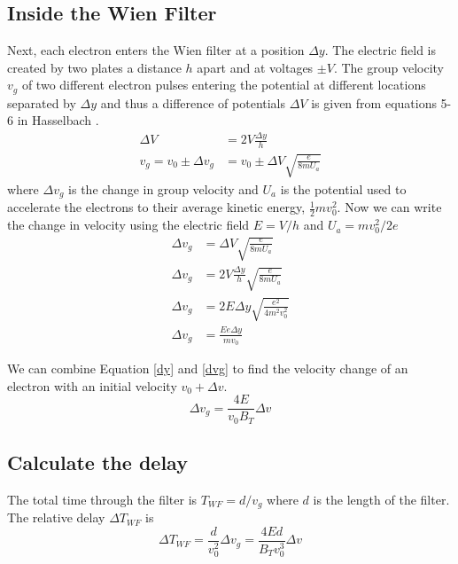 \documentclass[12pt,letterpaper]{article}
\newcommand{\eqqref}[1]{Equation \ref{#1}}
\newcommand{\dv}{\Delta v}
\newcommand{\dy}{\Delta y}
\newcommand{\dd}{\Delta }
\begin{document}
\subsection{Inside the Wien Filter}
Next, each electron enters the Wien filter at a position $\dy$. 
The electric field is created by two plates a distance $h$ apart and at voltages $\pm V$.
The group velocity $v_g$ of two different electron pulses entering the potential at different locations separated by $\dy$ and thus a difference of potentials $\dd V$ is given from equations 5-6 in Hasselbach \cite{hasselbach}.
\begin{align*}
   \dd V &= 2V \frac{\dy}{h} \\
   v_g = v_0 \pm \dv_g &= v_0 \pm \dd V \sqrt{\frac{e}{8 m U_a}}
\end{align*}
where $\dv_g$ is the change in group velocity and $U_a$ is the potential used to accelerate the electrons to their average kinetic energy, $\frac{1}{2}mv_0^2$.
Now we can write the change in velocity using the electric field $E=V/h$ and $U_a=mv_0^2/2e$
\begin{align}
   \dv_g&=\dd V \sqrt{\frac{e}{8 m U_a}} \nonumber \\
   \dv_g&= 2V \frac{\dy}{h} \sqrt{\frac{e}{8 m U_a}} \nonumber \\
   \dv_g&= 2 E \dy \sqrt{\frac{e^2}{4 m^2 v_0^2 }} \nonumber \\
   \dv_g&=\frac{Ee\dy}{mv_0} 
   \label{dvg}
\end{align}

We can combine \eqqref{dy} and \ref{dvg} to find the velocity change of an electron with an initial velocity $v_0+\dv$.
\begin{equation}
   \dv_g=\frac{4E}{v_0B_T}\dv
   \label{dvg2}
\end{equation}

\subsection{Calculate the delay}

The total time through the filter is $T_{WF}=d/v_g$ where $d$ is the length of the filter. 
The relative delay $\dd T_{WF}$ is 
\begin{equation}
\dd T_{WF}=\frac{d}{v_0^2}\dv_g=\frac{4 E d}{B_T v_0^3}\dv
\label{twf}
\end{equation}
\end{document}
